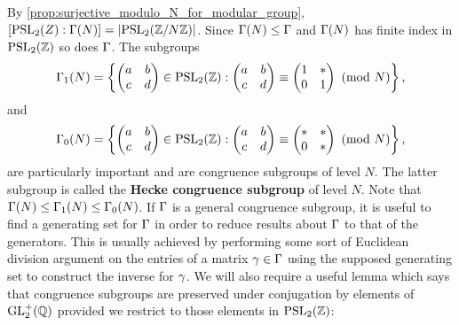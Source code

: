       By \cref{prop:surjective_modulo_N_for_modular_group}, $[\mathrm{PSL}_{2}(Z):\Gamma(N)] = |\mathrm{PSL}_{2}(\mathbb{Z}/N\mathbb{Z})|$. Since $\Gamma(N) \le \Gamma$ and $\Gamma(N)$ has finite index in $\mathrm{PSL}_{2}(\mathbb{Z})$ so does $\Gamma$. The subgroups
    \[
      \Gamma_{1}(N) = \left\{\begin{pmatrix} a & b \\ c & d \end{pmatrix} \in \mathrm{PSL}_{2}(\mathbb{Z}):\begin{pmatrix} a & b \\ c & d \end{pmatrix} \equiv \begin{pmatrix} 1 & \ast \\ 0 & 1 \end{pmatrix} \ \left(\text{mod }N\right)\right\},
    \]
    and
    \[
      \Gamma_{0}(N) = \left\{\begin{pmatrix} a & b \\ c & d \end{pmatrix} \in \mathrm{PSL}_{2}(\mathbb{Z}):\begin{pmatrix} a & b \\ c & d \end{pmatrix} \equiv \begin{pmatrix} \ast & \ast \\ 0 & \ast \end{pmatrix} \ \left(\text{mod }N\right)\right\},
    \]
    are particularly important and are congruence subgroups of level $N$. The latter subgroup is called the \textbf{Hecke congruence subgroup} of level $N$. Note that $\Gamma(N) \le \Gamma_{1}(N) \le \Gamma_{0}(N)$. If $\Gamma$ is a general congruence subgroup, it is useful to find a generating set for $\Gamma$ in order to reduce results about $\Gamma$ to that of the generators. This is usually achieved by performing some sort of Euclidean division argument on the entries of a matrix $\gamma \in \Gamma$ using the supposed generating set to construct the inverse for $\gamma$. We will also require a useful lemma which says that congruence subgroups are preserved under conjugation by elements of $\mathrm{GL}_{2}^{+}(\mathbb{Q})$ provided we restrict to those elements in $\mathrm{PSL}_{2}(\mathbb{Z})$:

